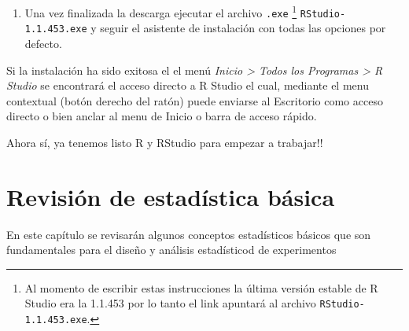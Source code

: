 \documentclass[a4paper]{book}
\providecommand{\tightlist}{%
  \setlength{\itemsep}{0pt}\setlength{\parskip}{0pt}}
\let\rmarkdownfootnote\footnote%
\def\footnote{\protect\rmarkdownfootnote}
\begin{document}
\begin{enumerate}
\def\labelenumi{\arabic{enumi})}
\setcounter{enumi}{2}
\tightlist
\item
  Una vez finalizada la descarga ejecutar el archivo \texttt{.exe}
  \footnote{Al momento de escribir estas instrucciones la última versión
    estable de R Studio era la 1.1.453 por lo tanto el link apuntará al
    archivo \texttt{RStudio-1.1.453.exe}.} \texttt{RStudio-1.1.453.exe}
  y seguir el asistente de instalación con todas las opciones por
  defecto.
\end{enumerate}

Si la instalación ha sido exitosa el el menú \emph{Inicio \textgreater{}
Todos los Programas \textgreater{} R Studio} se encontrará el acceso
directo a R Studio el cual, mediante el menu contextual (botón derecho
del ratón) puede enviarse al Escritorio como acceso directo o bien
anclar al menu de Inicio o barra de acceso rápido.

Ahora sí, ya tenemos listo R y RStudio para empezar a trabajar!!

\hypertarget{revision-de-estadistica-basica}{%
\chapter{Revisión de estadística
básica}\label{revision-de-estadistica-basica}}

En este capítulo se revisarán algunos conceptos estadísticos básicos que
son fundamentales para el diseño y análisis estadísticod de experimentos


\end{document}
